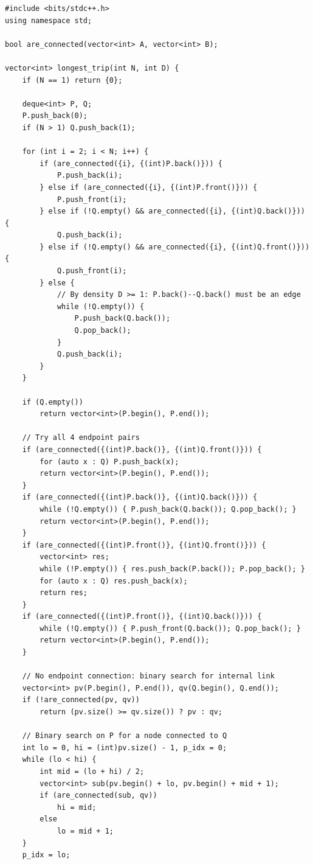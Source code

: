 \documentclass[11pt,a4paper]{article}
\begin{document}
\begin{lstlisting}
#include <bits/stdc++.h>
using namespace std;

bool are_connected(vector<int> A, vector<int> B);

vector<int> longest_trip(int N, int D) {
    if (N == 1) return {0};

    deque<int> P, Q;
    P.push_back(0);
    if (N > 1) Q.push_back(1);

    for (int i = 2; i < N; i++) {
        if (are_connected({i}, {(int)P.back()})) {
            P.push_back(i);
        } else if (are_connected({i}, {(int)P.front()})) {
            P.push_front(i);
        } else if (!Q.empty() && are_connected({i}, {(int)Q.back()})) {
            Q.push_back(i);
        } else if (!Q.empty() && are_connected({i}, {(int)Q.front()})) {
            Q.push_front(i);
        } else {
            // By density D >= 1: P.back()--Q.back() must be an edge
            while (!Q.empty()) {
                P.push_back(Q.back());
                Q.pop_back();
            }
            Q.push_back(i);
        }
    }

    if (Q.empty())
        return vector<int>(P.begin(), P.end());

    // Try all 4 endpoint pairs
    if (are_connected({(int)P.back()}, {(int)Q.front()})) {
        for (auto x : Q) P.push_back(x);
        return vector<int>(P.begin(), P.end());
    }
    if (are_connected({(int)P.back()}, {(int)Q.back()})) {
        while (!Q.empty()) { P.push_back(Q.back()); Q.pop_back(); }
        return vector<int>(P.begin(), P.end());
    }
    if (are_connected({(int)P.front()}, {(int)Q.front()})) {
        vector<int> res;
        while (!P.empty()) { res.push_back(P.back()); P.pop_back(); }
        for (auto x : Q) res.push_back(x);
        return res;
    }
    if (are_connected({(int)P.front()}, {(int)Q.back()})) {
        while (!Q.empty()) { P.push_front(Q.back()); Q.pop_back(); }
        return vector<int>(P.begin(), P.end());
    }

    // No endpoint connection: binary search for internal link
    vector<int> pv(P.begin(), P.end()), qv(Q.begin(), Q.end());
    if (!are_connected(pv, qv))
        return (pv.size() >= qv.size()) ? pv : qv;

    // Binary search on P for a node connected to Q
    int lo = 0, hi = (int)pv.size() - 1, p_idx = 0;
    while (lo < hi) {
        int mid = (lo + hi) / 2;
        vector<int> sub(pv.begin() + lo, pv.begin() + mid + 1);
        if (are_connected(sub, qv))
            hi = mid;
        else
            lo = mid + 1;
    }
    p_idx = lo;


\end{lstlisting}
\end{document}
